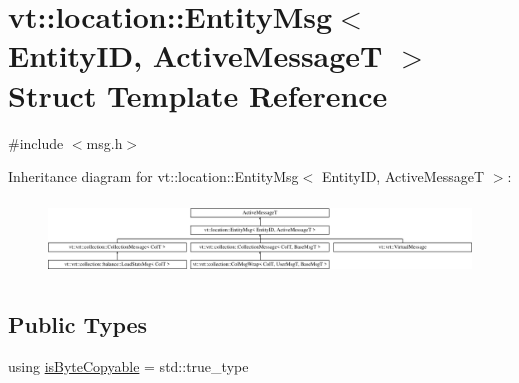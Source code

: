\hypertarget{structvt_1_1location_1_1_entity_msg}{}\section{vt\+:\+:location\+:\+:Entity\+Msg$<$ Entity\+ID, Active\+MessageT $>$ Struct Template Reference}
\label{structvt_1_1location_1_1_entity_msg}


{\ttfamily \#include $<$msg.\+h$>$}

Inheritance diagram for vt\+:\+:location\+:\+:Entity\+Msg$<$ Entity\+ID, Active\+MessageT $>$\+:\begin{figure}[H]
\begin{center}
\leavevmode
\includegraphics[height=1.996435cm]{structvt_1_1location_1_1_entity_msg}
\end{center}
\end{figure}
\subsection*{Public Types}
\begin{DoxyCompactItemize}
\item 
using \hyperlink{structvt_1_1location_1_1_entity_msg_a480dca0919780108c842bcb113bb28b1}{is\+Byte\+Copyable} = std\+::true\+\_\+type
\end{DoxyCompactItemize}
